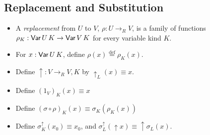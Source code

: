 \documentclass[envcountsame]{llncs}
\newcommand{\eqdef}{\ensuremath{\stackrel{\mathrm{def}}{=}}}
\begin{document}
  
% 

\subsection{Replacement and Substitution}

\begin{definition}[Replacement]
 \begin{itemize}
  \item A \emph{replacement} from $U$ to $V$, $\rho : U \rightarrow_R V$, is a family of functions $\rho_K : \AgdaDatatype{Var} \, U \, K \rightarrow
  \AgdaDatatype{Var} \, V \, K$ for every variable kind $K$.
  \item For $x : \AgdaDatatype{Var} \, U \, K$, define $\rho(x) \eqdef \rho_K(x)$.
  \item Define $\uparrow : V \rightarrow_R V , K$ by $\uparrow_L(x) \equiv x$.
  \item Define $(1_V)_K(x) \equiv x$
  \item Define $(\sigma \circ \rho)_K (x) \equiv \sigma_K (\rho_K(x))$
  \item Define $\sigma^\uparrow_K(x_0) \equiv x_0$, and $\sigma^\uparrow_L(\uparrow x) \equiv \uparrow \sigma_L(x)$.
\end{itemize}
\end{definition}
\end{document}
